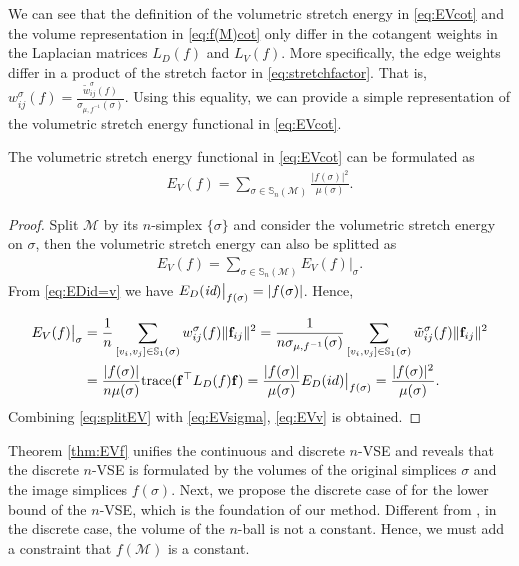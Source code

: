\documentclass{article}
\begin{document}
We can see that the definition of the volumetric stretch energy in \eqref{eq:EVcot} and the volume representation in \eqref{eq:f(M)cot} only differ in the cotangent weights in the Laplacian matrices $L_D(f)$ and $L_V(f)$. More specifically, the edge weights differ in a product of the stretch factor in \eqref{eq:stretchfactor}. That is, $w_{ij}^\sigma(f) = \frac{\tilde{w}_{ij}^\sigma(f)}{\sigma_{\mu,f^{-1}}(\sigma)}$. Using this equality, we can provide a simple representation of the volumetric stretch energy functional in \eqref{eq:EVcot}.

\begin{theorem} \label{thm:EVf}
    The volumetric stretch energy functional in \eqref{eq:EVcot} can be formulated as
    \begin{align} \label{eq:EVv}
        E_V(f) = \sum_{\sigma\in \mathbb{S}_n(\mathcal{M}) } \frac{|f(\sigma)|^2}{\mu(\sigma)}.
    \end{align}
\end{theorem}

\begin{proof}
    Split $\mathcal{M}$ by its $n$-simplex $\{\sigma\}$ and consider the volumetric stretch energy on $\sigma$, then the volumetric stretch energy can also be splitted as
    \begin{align} \label{eq:splitEV}
        E_V(f) = \sum_{\sigma\in \mathbb{S}_n(\mathcal{M})}E_V(f)\big|_\sigma.
    \end{align}
    From \eqref{eq:EDid=v} we have $E_D(\emph{id})\big|_{f(\sigma)} = |f(\sigma)|$. Hence,


    \begin{align}
        E_V(f)\big|_\sigma &= \frac{1}{n}  \sum_{[v_i,v_j]\in \mathbb{S}_1(\sigma)} w_{ij}^\sigma (f)\|\mathbf{f}_{ij}\|^2
        = \frac{1}{n \sigma_{\mu,f^{-1}}(\sigma)}  \sum_{[v_i,v_j]\in \mathbb{S}_1(\sigma)} \tilde{w}_{ij}^\sigma (f)\|\mathbf{f}_{ij}\|^2\\
        &= \frac{|f(\sigma)|}{n\mu(\sigma)} \mathrm{trace}(\mathbf{f}^\top L_D(f) \mathbf{f})
        = \frac{|f(\sigma)|}{\mu(\sigma)} E_D(id)\big|_{f(\sigma)} = \frac{|f(\sigma)|^2}{\mu(\sigma)}. \label{eq:EVsigma}
    \end{align}
    Combining \eqref{eq:splitEV} with \eqref{eq:EVsigma}, \eqref{eq:EVv} is obtained.
\end{proof}

Theorem \ref{thm:EVf} unifies the continuous and discrete $n$-VSE and reveals that the discrete $n$-VSE is formulated by the volumes of the original simplices $\sigma$ and the image simplices $f(\sigma)$.
Next, we propose the discrete case of  for the lower bound of the $n$-VSE, which is the foundation of our method. Different from , in the discrete case, the volume of the $n$-ball is not a constant. Hence, we must add a constraint that $f(\mathcal{M})$ is a constant.
\end{document}
